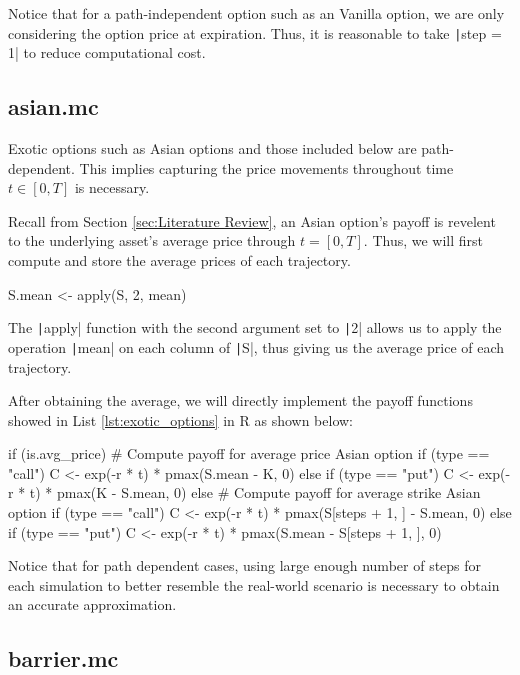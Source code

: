 Notice that for a path-independent option such as an Vanilla option, we are only considering the option price at expiration. Thus, it is reasonable to take \texttt|step = 1| to reduce computational cost.

\subsection{asian.mc}

Exotic options such as Asian options and those included below are path-dependent. This implies capturing the price movements throughout time $t\in[0,T]$ is necessary.

Recall from Section \ref{sec:Literature Review}, an Asian option's payoff is revelent to the underlying asset's average price through $t=[0,T]$. Thus, we will first compute and store the average prices of each trajectory.

\begin{Rminted}
S.mean <- apply(S, 2, mean)
\end{Rminted}

The \texttt|apply| function with the second argument set to \texttt|2| allows us to apply the operation \texttt|mean| on each column of \texttt|S|, thus giving us the average price of each trajectory.

After obtaining the average, we will directly implement the payoff functions showed in List \ref{lst:exotic_options} in R as shown below:

\begin{Rminted}
if (is.avg_price) { # Compute payoff for average price Asian option
    if (type == "call") {
        C <- exp(-r * t) * pmax(S.mean - K, 0)
    } else if (type == "put") {
        C <- exp(-r * t) * pmax(K - S.mean, 0)
    }
} else { # Compute payoff for average strike Asian option
    if (type == "call") {
        C <- exp(-r * t) * pmax(S[steps + 1, ] - S.mean, 0)
    } else if (type == "put") {
        C <- exp(-r * t) * pmax(S.mean - S[steps + 1, ], 0)
    }
}
\end{Rminted}

Notice that for path dependent cases, using large enough number of steps for each simulation to better resemble the real-world scenario is necessary to obtain an accurate approximation.

\subsection{barrier.mc}

